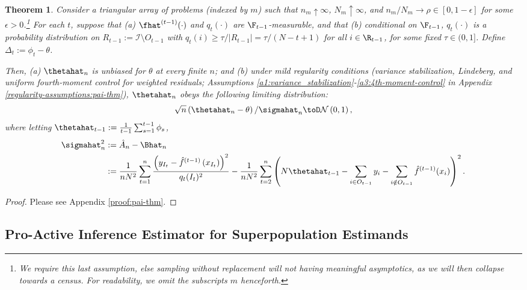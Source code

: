 \documentclass[11pt]{article}
\newtheorem{theorem}{Theorem}
\begin{document}
\begin{theorem}
\label{thm:pai-asymptotic-distribution}
    Consider a triangular array of problems (indexed by $m$) such that $n_m \uparrow \infty$, $N_m \uparrow \infty$, and $n_m/N_m \to \rho \in [0, 1 - \epsilon]$ for some $\epsilon > 0$.\footnote{We require this last assumption, else sampling without replacement will not having meaningful asymptotics, as we will then collapse towards a census. For readability, we omit the subscripts $m$ henceforth.} For each $t$, suppose that (a) $\fhat^{(t-1)}(\cdot)$ and $q_t(\cdot)$ are $\F_{t-1}$-measurable, and that (b) conditional on $\F_{t-1}$, $q_t(\cdot)$ is a probability distribution on $R_{t-1} := \mathcal{I} \setminus O_{t-1}$ with $q_t(i) \geq \tau / |R_{t-1}| = \tau / (N - t + 1)$ for all $i \in \R_{t-1}$, for some fixed $\tau \in (0, 1]$. Define $\Delta_t := \phi_t - \theta$.

    Then, (a) $\thetahat_n$ is unbiased for $\theta$ at every finite $n$; and (b) under mild regularity conditions (variance stabilization, Lindeberg, and uniform fourth-moment control for weighted residuals; Assumptions \ref{a1:variance_stabilization}-\ref{a3:4th-moment-control} in Appendix \ref{regularity-assumptions:pai-thm}), $\thetahat_n$ obeys the following limiting distribution:
    \begin{align}
        \sqrt{n}\left( \thetahat_n - \theta \right) / \sigmahat_{n} \toD \mathcal{N}\left( 0, 1\right),
    \end{align}
    where letting $\thetahat_{t-1} := \frac{1}{t-1} \sum_{s=1}^{t-1} \phi_s$,
    \begin{align*}
        \sigmahat_n^2 &:= \hat{A}_n - \Bhat_n\\
        &:= \frac{1}{nN^2} \sum_{t=1}^n \frac{\left( y_{I_t} - \hat{f}^{(t-1)}\left( x_{I_t} \right) \right)^2}{q_t(I_t)^2} - \frac{1}{nN^2} \sum_{t=2}^n \left( N\thetahat_{t-1} - \sum_{i \in O_{t-1}} y_i - \sum_{i \notin O_{t-1}} \hat{f}^{(t-1)}(x_i) \right)^2.
    \end{align*}
\end{theorem}

\begin{proof}
    Please see Appendix \ref{proof:pai-thm}.
\end{proof}

\subsection{Pro-Active Inference Estimator for Superpopulation Estimands}
\end{document}
